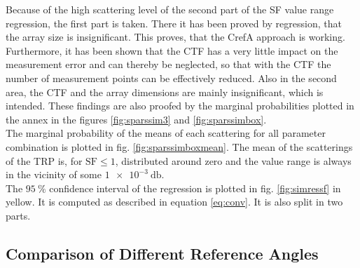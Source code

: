 Because of the high scattering level of the second part of the \ac{SF} value range regression, the first part is taken. There it has been proved by regression, that the array size is insignificant. This proves, that the \ac{CrefA} approach is working. 
Furthermore, it has been shown that the \ac{CTF} has a very little impact on the measurement error and can thereby be neglected, so that with the \ac{CTF} the number of measurement points can be effectively reduced. 
Also in the second area, the \ac{CTF} and the array dimensions are mainly insignificant, which is intended. These findings are also proofed by the marginal probabilities plotted in the annex in the figures \ref{fig:sparssim3} and \ref{fig:sparssimbox}.\\
The marginal probability of the means of each scattering for all parameter combination is plotted in fig. \ref{fig:sparssimboxmean}. The mean of the scatterings of the \ac{TRP} is, for $\text{SF} \le 1$, distributed around zero and the value range is always in the vicinity of some $\SI{1e-3}{\decibel}$.\\
The $\SI{95}{\percent}$ confidence interval of the regression is plotted in fig. \ref{fig:simressf} in yellow. It is computed as described in equation \ref{eq:conv}. It is also split in two parts.

\subsection{Comparison of Different Reference Angles}

